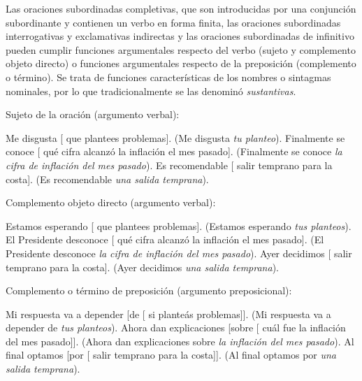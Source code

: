 Las oraciones subordinadas completivas, que son introducidas por una conjunción
subordinante y contienen un verbo en forma finita, las oraciones subordinadas
interrogativas y exclamativas indirectas y las oraciones subordinadas de
infinitivo pueden cumplir funciones argumentales respecto del verbo (sujeto y
complemento objeto directo) o funciones argumentales respecto de la preposición
(complemento o término). Se trata de funciones características de los nombres o
sintagmas nominales, por lo que tradicionalmente se las denominó
\textit{sustantivas}.

\begin{exe}
  \ex\label{ex:13-suj} Sujeto de la oración (argumento verbal):
    \begin{xlist}
      \ex\label{ex:13-suj-a} Me disgusta [ que plantees problemas].
          (Me disgusta \textit{tu planteo}).
      \ex\label{ex:13-suj-b} Finalmente se conoce [ qué cifra alcanzó
          la inflación el mes pasado]. (Finalmente se conoce \textit{la cifra de
          inflación del mes pasado}).
      \ex\label{ex:13-suj-c} Es recomendable [ salir temprano para la
          costa]. (Es recomendable \textit{una salida temprana}).
    \end{xlist}
  \ex\label{ex:13-cod} Complemento objeto directo (argumento verbal):
    \begin{xlist}
      \ex\label{ex:13-cod-a} Estamos esperando [ que plantees
          problemas]. (Estamos esperando \textit{tus planteos}).
      \ex\label{ex:13-cod-b} El Presidente desconoce [ qué cifra
          alcanzó la inflación el mes pasado]. (El Presidente desconoce \textit{la
          cifra de inflación del mes pasado}).
      \ex\label{ex:13-cod-c} Ayer decidimos [ salir temprano para la
          costa]. (Ayer decidimos \textit{una salida temprana}).
    \end{xlist}
  \ex\label{ex:13-ct} Complemento o término de preposición (argumento
      preposicional):
    \begin{xlist}
      \ex\label{ex:13-ct-a} Mi respuesta va a depender [de [ si
          planteás problemas]]. (Mi respuesta va a depender de \textit{tus
          planteos}).
      \ex\label{ex:13-ct-b} Ahora dan explicaciones [sobre [ cuál fue
          la inflación del mes pasado]]. (Ahora dan explicaciones sobre \textit{la
          inflación del mes pasado}).
      \ex\label{ex:13-ct-c} Al final optamos [por [ salir temprano para
          la costa]]. (Al final optamos por \textit{una salida temprana}).
    \end{xlist}
\end{exe}


